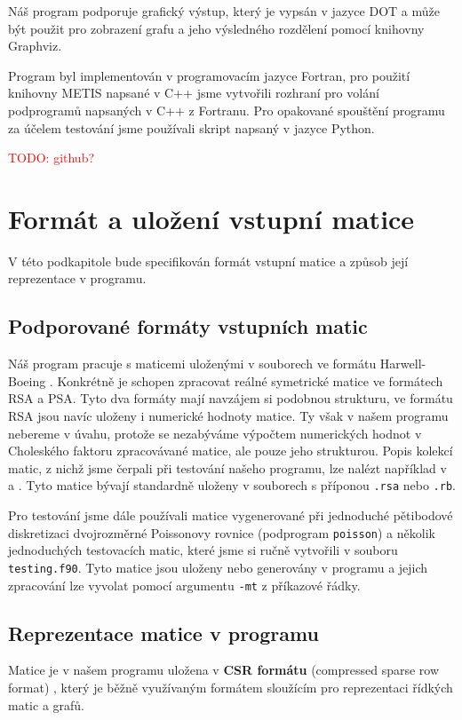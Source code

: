 \documentclass{ctuthesis}
\theoremstyle{plain}
\theoremstyle{definition}
\newcommand{\TODO}[1]{\textcolor{red}{TODO: #1}\PackageWarning{TODO:}{TODO: #1!}}
\begin{document}
Náš program podporuje grafický výstup, který je vypsán v jazyce DOT a může být použit pro zobrazení grafu a jeho výsledného rozdělení pomocí knihovny Graphviz.

Program byl implementován v programovacím jazyce Fortran, pro použití knihovny METIS napsané v C++ jsme vytvořili rozhraní pro volání podprogramů napsaných v C++ z Fortranu. Pro opakované spouštění programu za účelem testování jsme používali skript napsaný v jazyce Python.

\TODO{github?}

\section{Formát a uložení vstupní matice}
V této podkapitole bude specifikován formát vstupní matice a způsob její reprezentace v programu.

\subsection{Podporované formáty vstupních matic}

Náš program pracuje s maticemi uloženými v souborech ve formátu Harwell-Boeing \cite{bopo:97}. Konkrétně je schopen zpracovat reálné symetrické matice ve formátech RSA a PSA. Tyto dva formáty mají navzájem si podobnou strukturu, ve formátu RSA jsou navíc uloženy i numerické hodnoty matice. Ty však v našem programu nebereme v úvahu, protože se nezabýváme výpočtem numerických hodnot v Choleského faktoru zpracovávané matice, ale pouze jeho strukturou. Popis kolekcí matic, z nichž jsme čerpali při testování našeho programu, lze nalézt například v \cite{ssmcol} a \cite{hbcol}. Tyto matice bývají standardně uloženy v souborech s příponou \texttt{.rsa} nebo \texttt{.rb}.

Pro testování jsme dále používali matice vygenerované při jednoduché pětibodové diskretizaci dvojrozměrné Poissonovy rovnice (podprogram \texttt{poisson}) a několik jednoduchých testovacích matic, které jsme si ručně vytvořili v souboru \texttt{testing.f90}. Tyto matice jsou uloženy nebo generovány v programu a jejich zpracování lze vyvolat pomocí argumentu \texttt{-mt} z příkazové řádky.

\subsection{Reprezentace matice v programu}
\label{matrixProgReprez}

Matice je v našem programu uložena v \textbf{CSR formátu} (compressed sparse row format) \cite{pis:84,saad:94}, který je běžně využívaným formátem sloužícím pro reprezentaci řídkých matic a grafů.
\end{document}
